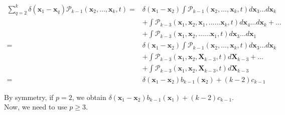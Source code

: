 \begin{subequations} 
\begin{flalign}
\sum_{q=2}^{k}\delta({\boldsymbol{x}_1-\boldsymbol{x}_q})\mathcal{P}_{k-1}(\boldsymbol{x}_{2},\ldots,\boldsymbol{x}_{k},t) = & \delta(\boldsymbol{x}_{1}-\boldsymbol{x}_{2})\int\mathcal{P}_{k-1}(\boldsymbol{x}_{2},\ldots,\boldsymbol{x}_{k},t)d\boldsymbol{x}_{3}\ldots d\boldsymbol{x}_{k}\\
&+ \int\mathcal{P}_{k-3}(\boldsymbol{x}_{1},\boldsymbol{x}_{2},\boldsymbol{x}_{1},\ldots...\boldsymbol{x}_{k},t)d\boldsymbol{x}_{4}\ldots d\boldsymbol{x}_{k} + \ldots \\
& +\int\mathcal{P}_{k-3}(\boldsymbol{x}_{1},\boldsymbol{x}_{2},\ldots...\boldsymbol{x}_{1},t)d\boldsymbol{x}_{3}\ldots d\boldsymbol{x}_{1}\\
=&\delta(\boldsymbol{x}_{1}-\boldsymbol{x}_{2})\int\mathcal{P}_{k-1}(\boldsymbol{x}_{2},\ldots,\boldsymbol{x}_{k},t)d\boldsymbol{x}_{3}\ldots d\boldsymbol{x}_{k}\\
 & +\int\mathcal{P}_{k-3}(\boldsymbol{x}_{1},\boldsymbol{x}_{2},\boldsymbol{X}_{k-3},t)d\boldsymbol{X}_{k-3}+\ldots\\
 & +\int\mathcal{P}_{k-3}(\boldsymbol{x}_{1},\boldsymbol{x}_{2},\boldsymbol{X}_{k-3},t)d\boldsymbol{X}_{k-3}\\
= & \delta(\boldsymbol{x}_{1}-\boldsymbol{x}_{2})b_{k-1}(\boldsymbol{x}_{2})+(k-2)c_{k-1}
\end{flalign}
\end{subequations}

By symmetry, if $p=2$, we obtain $\delta(\boldsymbol{x}_{1}-\boldsymbol{x}_{2})b_{k-1}(\boldsymbol{x}_{1})+(k-2)c_{k-1}$.\\

Now, we need to use $p\geq3$.

